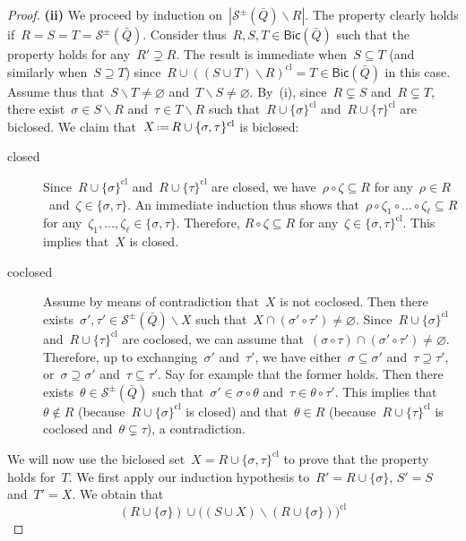 \documentclass{amsart}
\theoremstyle{definition}
\newcommand{\ssm}{\smallsetminus} %
\newcommand{\eqdef}{\mbox{\,\raisebox{0.2ex}{\scriptsize\ensuremath{\mathrm:}}\ensuremath{=}\,}} %
\newcommand{\strings}{\mathcal{S}} %
\newcommand{\closure}[1]{#1^{\mathrm{cl}}} %
\newcommand{\Bicl}[1]{\mathsf{Bic}(#1)} %
\begin{document}
\begin{proof}
\medskip\noindent
{\bf (ii)}
We proceed by induction on~$|\strings^\pm(\bar Q) \ssm R|$. The property clearly holds if~${R = S = T = \strings^\pm(\bar Q)}$. Consider thus~$R,S,T \in \Bicl{\bar Q}$ such that the property holds for any~$R' \supsetneq R$. The result is immediate when~$S \subseteq T$ (and similarly when~$S \supseteq T$) since~$R \cup \closure{((S \cup T) \ssm R)} = T \in \Bicl{\bar Q}$ in this case. Assume thus that~$S \ssm T \ne \varnothing$ and~$T \ssm S \ne \varnothing$. By~(i), since~$R \subsetneq S$ and~$R \subsetneq T$, there exist~$\sigma \in S \ssm R$ and~$\tau \in T \ssm R$ such that~$R \cup \closure{\{\sigma\}}$ and~$R \cup \closure{\{\tau\}}$ are biclosed. We claim that~$X \eqdef R \cup \closure{\{\sigma,\tau\}}$ is biclosed:
\begin{description}
\item[closed] Since~$R \cup \closure{\{\sigma\}}$ and~$R \cup \closure{\{\tau\}}$ are closed, we have~$\rho \circ \zeta \subseteq R$ for any~$\rho \in R$~and~${\zeta \in \{\sigma,\tau\}}$. An immediate induction thus shows that~$\rho \circ \zeta_1 \circ \dots \circ \zeta_\ell \subseteq R$ for any~$\zeta_1, \dots, \zeta_\ell \in \{\sigma, \tau\}$. Therefore, $R \circ \zeta \subseteq R$ for any~$\zeta \in \closure{\{\sigma,\tau\}}$. This implies that~$X$ is closed.
\item[coclosed] Assume by means of contradiction that~$X$ is not coclosed. Then there exists~$\sigma', \tau' \in \strings^\pm(\bar Q) \ssm X$ such that~$X \cap (\sigma' \circ \tau') \ne \varnothing$. Since~$R \cup \closure{\{\sigma\}}$ and~$R \cup \closure{\{\tau\}}$ are coclosed, we can assume that~$(\sigma \circ \tau) \cap (\sigma' \circ \tau') \ne \varnothing$. Therefore, up to exchanging~$\sigma'$ and~$\tau'$, we have either~$\sigma \subseteq \sigma'$ and~$\tau \supseteq \tau'$, or~$\sigma \supseteq \sigma'$ and~$\tau \subseteq \tau'$. Say for example that the former holds. Then there exists~$\theta \in \strings^\pm(\bar Q)$ such that~$\sigma' \in \sigma \circ \theta$ and~$\tau \in \theta \circ \tau'$. This implies that~$\theta \notin R$ (because~$R \cup \closure{\{\sigma\}}$ is closed) and that~$\theta \in R$ (because~$R \cup \closure{\{\tau\}}$ is coclosed and~$\theta \subsetneq \tau$), a contradiction.
\end{description}
We will now use the biclosed set~$X = R \cup \closure{\{\sigma, \tau\}}$ to prove that the property holds for~$T$.
We first apply our induction hypothesis to~$R' = R \cup \{\sigma\}$, $S' = S$ and~$T' = X$. We obtain that
\[
(R \cup \{\sigma\}) \cup \closure{\big( ( S \cup X ) \ssm (R \cup \{\sigma\}) \big)}
\]
\end{proof}
\end{document}
